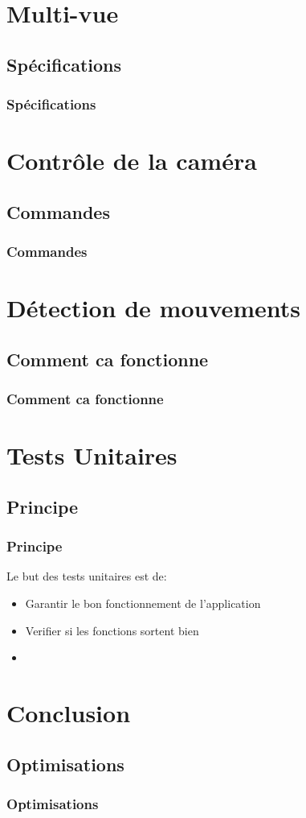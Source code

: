 \documentclass{beamer}
\begin{document}
\section{Multi-vue}
\subsection{Spécifications}
 \begin{frame}
   \frametitle{Spécifications}

\end{frame}

\section{Contrôle de la caméra}
\subsection{Commandes}
 \begin{frame}
   \frametitle{Commandes}

\end{frame}

\section{Détection de mouvements}
\subsection{Comment ca fonctionne}
 \begin{frame}
   \frametitle{Comment ca fonctionne}

\end{frame}

\section{Tests Unitaires}
\subsection{Principe}
 \begin{frame}
   \frametitle{Principe}
Le but des tests unitaires est de:
\begin{itemize}
    \item<2-> Garantir le bon fonctionnement de l'application
    \item<3-> Verifier si les fonctions sortent bien
    \item<4-> 
   \end{itemize}
\end{frame}

\section{Conclusion}
\subsection{Optimisations}
 \begin{frame}
   \frametitle{Optimisations}

\end{frame}
\end{document}
